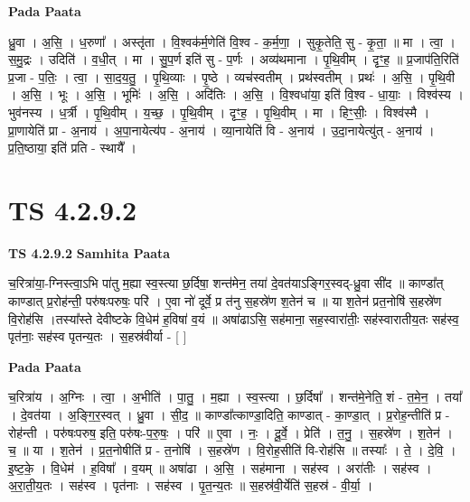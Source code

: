 \documentclass[17pt]{extarticle}
\begin{document}
\textbf{Pada Paata} \newline

ध्रु॒वा । अ॒सि॒ । ध॒रुणा᳚ । अस्तृ॑ता । वि॒श्वक॑र्म॒णेति॑ वि॒श्व - क॒र्म॒णा॒ । सुकृ॒तेति॒ सु - कृ॒ता॒ ॥ मा । त्वा॒ । स॒मु॒द्रः । उदिति॑ । व॒धी॒त् । मा । सु॒प॒र्ण इति॑ सु - प॒र्णः । अव्य॑थमाना । पृ॒थि॒वीम् । दृꣳ॒॒ह॒ ॥ प्र॒जाप॑ति॒रिति॑ प्र॒जा - प॒तिः॒ । त्वा॒ । सा॒द॒य॒तु॒ । पृ॒थि॒व्याः । पृ॒ष्ठे । व्यच॑स्वतीम् । प्रथ॑स्वतीम् । प्रथः॑ । अ॒सि॒ । पृ॒थि॒वी । अ॒सि॒ । भूः । अ॒सि॒ । भूमिः॑ । अ॒सि॒ । अदि॑तिः । अ॒सि॒ । वि॒श्वधा॑या॒ इति॑ वि॒श्व - धा॒याः॒ । विश्व॑स्य । भुव॑नस्य । ध॒र्त्री । पृ॒थि॒वीम् । य॒च्छ॒ । पृ॒थि॒वीम् । दृꣳ॒॒ह॒ । पृ॒थि॒वीम् । मा । हिꣳ॒॒सीः॒ । विश्व॑स्मै । प्रा॒णायेति॑ प्रा - अ॒नाय॑ । अ॒पा॒नायेत्य॑प - अ॒नाय॑ । व्या॒नायेति॑ वि - अ॒नाय॑ । उ॒दा॒नायेत्यु॑त् - अ॒नाय॑ । प्र॒ति॒ष्ठाया॒ इति॑ प्रति - स्थायै᳚ ।  \newline




\section*{ TS 4.2.9.2 }

\textbf{TS 4.2.9.2 } \newline
\textbf{Samhita Paata} \newline

च॒रित्रा॑या॒-ग्निस्त्वा॒ऽभि पा॑तु म॒ह्या स्व॒स्त्या छ॒र्दिषा॒ शन्त॑मेन॒ तया॑ दे॒वत॑याऽङ्गिर॒स्वद्-ध्रु॒वा सी॑द ॥ काण्डा᳚त् काण्डात् प्र॒रोह॑न्ती॒ परु॑षःपरुषः॒ परि॑ । ए॒वा नो॑ दूर्वे॒ प्र त॑नु स॒हस्रे॑ण श॒तेन॑ च ॥ या श॒तेन॑ प्रत॒नोषि॑ स॒हस्रे॑ण वि॒रोह॑सि ।तस्या᳚स्ते देवीष्टके वि॒धेम॑ ह॒विषा॑ व॒यं ॥ अषा॑ढाऽसि॒ सह॑माना॒ सह॒स्वारा॑तीः॒ सह॑स्वारातीय॒तः सह॑स्व॒ पृत॑नाः॒ सह॑स्व पृतन्य॒तः । स॒हस्र॑वीर्या - [  ] \newline

\textbf{Pada Paata} \newline

च॒रित्रा॑य । अ॒ग्निः । त्वा॒ । अ॒भीति॑ । पा॒तु॒ । म॒ह्या । स्व॒स्त्या । छ॒र्दिषा᳚ । शन्त॑मे॒नेति॒ शं - त॒मे॒न॒ । तया᳚ । दे॒वत॑या । अ॒ङ्गि॒र॒स्वत् । ध्रु॒वा । सी॒द॒ ॥ काण्डा᳚त्काण्डा॒दिति॒ काण्डात् - का॒ण्डा॒त् । प्र॒रोह॒न्तीति॑ प्र - रोह॑न्ती । परु॑षःपरुष॒ इति॒ परु॑षः-प॒रु॒षः॒ । परि॑ ॥ ए॒वा । नः॒ । दू॒र्वे॒ । प्रेति॑ । त॒नु॒ । स॒हस्रे॑ण । श॒तेन॑ । च॒ ॥ या । श॒तेन॑ । प्र॒त॒नोषीति॑ प्र - त॒नोषि॑ । स॒हस्रे॑ण । वि॒रोह॒सीति॑ वि-रोह॑सि ॥ तस्याः᳚ । ते॒ । दे॒वि॒ । इ॒ष्ट॒के॒ । वि॒धेम॑ । ह॒विषा᳚ । व॒यम् ॥ अषा॑ढा । अ॒सि॒ । सह॑माना । सह॑स्व । अरा॑तीः । सह॑स्व । अ॒रा॒ती॒य॒तः । सह॑स्व । पृत॑नाः । सह॑स्व । पृ॒त॒न्य॒तः ॥ स॒हस्र॑वी॒र्येति॑ स॒हस्र॑ - वी॒र्या॒ ।  \newline
\end{document}
